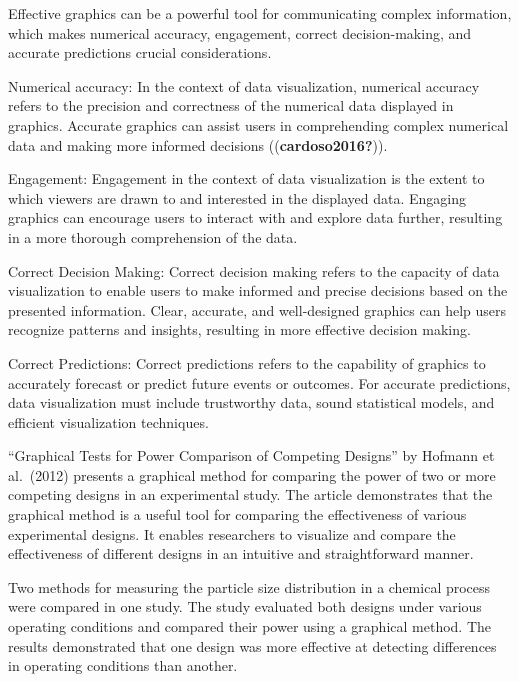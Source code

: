 \documentclass[print]{nuthesis}
\begin{document}
Effective graphics can be a powerful tool for communicating complex information, which makes numerical accuracy, engagement, correct decision-making, and accurate predictions crucial considerations.

Numerical accuracy: In the context of data visualization, numerical accuracy refers to the precision and correctness of the numerical data displayed in graphics.
Accurate graphics can assist users in comprehending complex numerical data and making more informed decisions ((\textbf{cardoso2016?})).

Engagement: Engagement in the context of data visualization is the extent to which viewers are drawn to and interested in the displayed data.
Engaging graphics can encourage users to interact with and explore data further, resulting in a more thorough comprehension of the data.

Correct Decision Making: Correct decision making refers to the capacity of data visualization to enable users to make informed and precise decisions based on the presented information.
Clear, accurate, and well-designed graphics can help users recognize patterns and insights, resulting in more effective decision making.

Correct Predictions: Correct predictions refers to the capability of graphics to accurately forecast or predict future events or outcomes.
For accurate predictions, data visualization must include trustworthy data, sound statistical models, and efficient visualization techniques.

``Graphical Tests for Power Comparison of Competing Designs'' by Hofmann et al.~(2012) presents a graphical method for comparing the power of two or more competing designs in an experimental study. The article demonstrates that the graphical method is a useful tool for comparing the effectiveness of various experimental designs.
It enables researchers to visualize and compare the effectiveness of different designs in an intuitive and straightforward manner.

Two methods for measuring the particle size distribution in a chemical process were compared in one study.
The study evaluated both designs under various operating conditions and compared their power using a graphical method.
The results demonstrated that one design was more effective at detecting differences in operating conditions than another.

\end{document}
